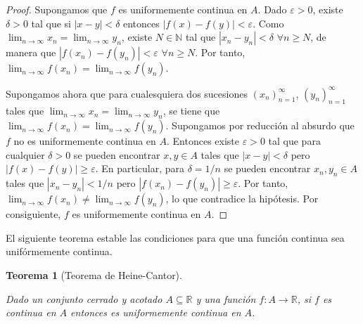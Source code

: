 \documentclass[
  a4paper,
]{scrreport}
\theoremstyle{definition}
\theoremstyle{definition}
\theoremstyle{definition}
\theoremstyle{plain}
\newtheorem{theorem}{Teorema}[chapter]
\theoremstyle{plain}
\theoremstyle{plain}
\theoremstyle{remark}
\begin{document}
\begin{tcolorbox}[enhanced jigsaw, bottomtitle=1mm, title=\textcolor{quarto-callout-note-color}{\faInfo}\hspace{0.5em}{Demostración}, colbacktitle=quarto-callout-note-color!10!white, coltitle=black, leftrule=.75mm, colback=white, toptitle=1mm, toprule=.15mm, titlerule=0mm, opacitybacktitle=0.6, colframe=quarto-callout-note-color-frame, bottomrule=.15mm, arc=.35mm, rightrule=.15mm, breakable, left=2mm, opacityback=0]

\begin{proof}
Supongamos que \(f\) es uniformemente continua en \(A\). Dado
\(\varepsilon>0\), existe \(\delta>0\) tal que si \(|x-y|<\delta\)
entonces \(|f(x)-f(y)|<\varepsilon\). Como
\(\lim_{n\to\infty}x_n=\lim_{n\to\infty}y_n\), existe \(N\in\mathbb{N}\)
tal que \(|x_n-y_n|<\delta\) \(\forall n\geq N\), de manera que
\(|f(x_n)-f(y_n)|<\varepsilon\) \(\forall n\geq N\). Por tanto,
\(\lim_{n\to\infty}f(x_n)=\lim_{n\to\infty}f(y_n)\).

Supongamos ahora que para cualesquiera dos sucesiones
\((x_n)_{n=1}^\infty\), \((y_n)_{n=1}^\infty\) tales que
\(\lim_{n\to\infty}x_n=\lim_{n\to\infty}y_n\), se tiene que
\(\lim_{n\to\infty}f(x_n)=\lim_{n\to\infty}f(y_n)\). Supongamos por
reducción al absurdo que \(f\) no es uniformemente continua en \(A\).
Entonces existe \(\varepsilon>0\) tal que para cualquier \(\delta>0\) se
pueden encontrar \(x,y\in A\) tales que \(|x-y|<\delta\) pero
\(|f(x)-f(y)|\geq \varepsilon\). En particular, para \(\delta=1/n\) se
pueden encontrar \(x_n,y_n\in A\) tales que \(|x_n-y_n|<1/n\) pero
\(|f(x_n)-f(y_n)|\geq \varepsilon\). Por tanto,
\(\lim_{n\to\infty}f(x_n)\neq\lim_{n\to\infty}f(y_n)\), lo que
contradice la hipótesis. Por consiguiente, \(f\) es uniformemente
continua en \(A\).
\end{proof}

\end{tcolorbox}

El siguiente teorema estable las condiciones para que una función
continua sea unifórmemente continua.

\begin{theorem}[Teorema de
Heine-Cantor]\protect\hypertarget{thm-funcion-uniformemente-continua}{}\label{thm-funcion-uniformemente-continua}

Dado un conjunto cerrado y acotado \(A\subseteq \mathbb{R}\) y una
función \(f:A\to \mathbb{R}\), si \(f\) es continua en \(A\) entonces es
uniformemente continua en \(A\).

\end{theorem}
\end{document}
